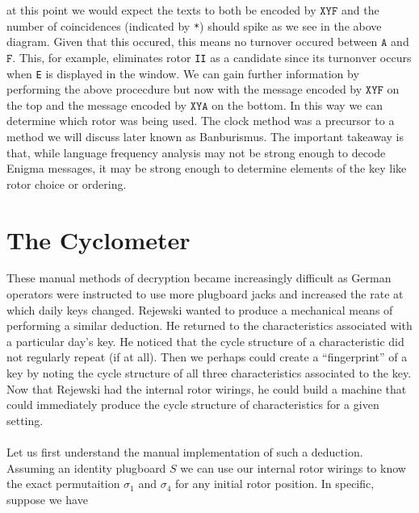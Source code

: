 at this point we would expect the texts to both be encoded by
$\texttt{XYF}$ and the number of coincidences (indicated by
\texttt{*}) should spike as we see in the above diagram. Given that
this occured, this means no turnover occured between $\texttt{A}$ and
$\texttt{F}$. This, for example, eliminates rotor \texttt{II} as a
candidate since its turnonver occurs when \texttt{E} is displayed in
the window. We can gain further information by performing the above
procecdure but now with the message encoded by $\texttt{XYF}$ on the
top and the message encoded by $\texttt{XYA}$ on the bottom. In this
way we can determine which rotor was being used. The clock method was
a precursor to a method we will discuss later known as Banburismus.
The important takeaway is that, while language frequency analysis may not be
strong enough to decode Enigma messages, it may be strong enough to
determine elements of the key like rotor choice or ordering.

\section{The Cyclometer}

These manual methods of decryption became increasingly difficult as
German operators were instructed to use more plugboard jacks and
increased the rate at which daily keys changed. Rejewski wanted to
produce a mechanical means of performing a similar deduction. He
returned to the characteristics associated with a particular day's
key. He noticed that the cycle structure of a characteristic did not
regularly repeat (if at all). Then we perhaps could create a
``fingerprint'' of a key by noting the cycle structure of all three
characteristics associated to the key. Now that Rejewski had the
internal rotor wirings, he could build a machine that could
immediately produce the cycle structure of characteristics for a given setting.
\\\\Let us first understand the manual implementation of such a
deduction. Assuming an identity plugboard $S$ we can use our internal
rotor wirings to know the exact permutaition $\sigma_1$ and
$\sigma_4$ for any initial rotor position. In specific, suppose we have

